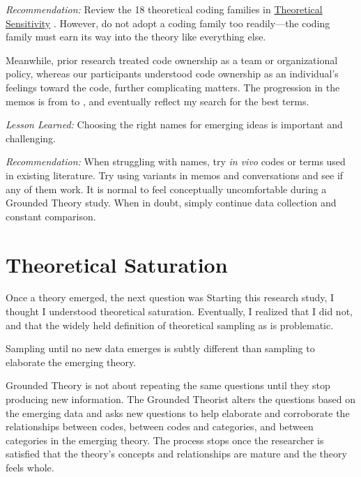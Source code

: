 \textit{Recommendation:} Review the 18 theoretical coding families in \underline{Theoretical Sensitivity} \cite{GlaserTheoreticalSensitivity}. However, do not adopt a coding family too readily---the coding family must earn its way into the theory like everything else.

Meanwhile, prior research treated code ownership as a team or organizational policy, whereas  our participants understood code ownership as an individual's feelings toward the code, further complicating matters. The progression in the memos is from  to ,  and eventually   reflect my search for the best terms.

\textit{Lesson Learned:} Choosing the right names for emerging ideas is important and challenging.  

\textit{Recommendation:} When struggling with names, try \textit{in vivo} codes or terms used in existing literature. Try using variants in memos and conversations and see if any of them work. It is normal to feel conceptually uncomfortable during a Grounded Theory study. When in doubt, simply continue data collection and constant comparison.
\section{Theoretical Saturation}
\label{TheoreticalSaturation}
Once a theory emerged, the next question was  Starting this research study, I thought I understood theoretical saturation. Eventually, I realized that I did not, and that the widely held definition of theoretical sampling as  \cite{MorseTheoreticalSaturation} is problematic. 

Sampling until no new data emerges is subtly different than sampling to elaborate the emerging theory. 

Grounded Theory is not about repeating the same questions until they stop producing new information. The Grounded Theorist alters the questions based on the emerging data and asks new questions to help elaborate and corroborate the relationships between codes, between codes and categories, and between categories in the emerging theory. The process stops once the researcher is satisfied that the theory's concepts and relationships are mature and the theory feels whole. 

